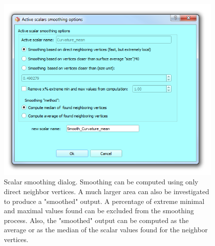 \begin{figure}
  \centering
  \includegraphics[scale=0.5]{images/11/scalar_smoothing_dialog.png} 
	\caption{ 
Scalar smoothing dialog. Smoothing can be computed using only direct neighbor vertices. A much larger area can also be investigated to produce a "smoothed" output. A percentage of extreme minimal and maximal values found can be excluded from the smoothing process. Also, the "smoothed" output can be computed as the average or as the median of the scalar values found for the neighbor vertices.
	}
\label{smoothing_scalars_dialog}
\end{figure}


